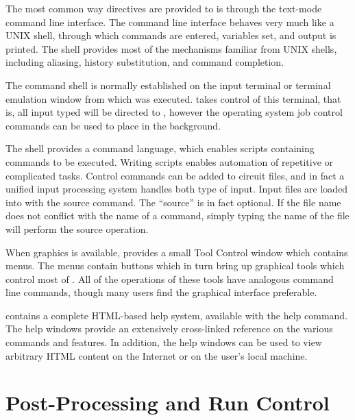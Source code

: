 The most common way directives are provided to {\WRspice} is through
the text-mode command line interface.  The command line interface
behaves very much like a UNIX shell, through which commands are
entered, variables set, and output is printed.  The shell provides
most of the mechanisms familiar from UNIX shells, including aliasing,
history substitution, and command completion.

The command shell is normally established on the input terminal or
terminal emulation window from which {\WRspice} was executed. 
{\WRspice} takes control of this terminal, that is, all input typed
will be directed to {\WRspice}, however the operating system job
control commands can be used to place {\WRspice} in the background.

The {\WRspice} shell provides a command language, which enables
scripts containing commands to be executed.  Writing scripts enables
automation of repetitive or complicated tasks.  Control commands can be
added to circuit files, and in fact a unified input processing system
handles both type of input.  Input files are loaded into {\WRspice} with
the {\cb source} command.  The ``{\vt source}'' is in fact optional.
If the file name does not conflict with the name of a {\WRspice} command,
simply typing the name of the file will perform the {\cb source}
operation.

When graphics is available, {\WRspice} provides a small {\cb Tool
Control} window which contains menus.  The menus contain buttons
which in turn bring up graphical tools which control most of
{\WRspice}.  All of the operations of these tools have analogous
command line commands, though many users find the graphical interface
preferable.

{\WRspice} contains a complete HTML-based help system, available with
the {\et help} command.  The help windows provide an extensively
cross-linked reference on the various commands and features.  In addition,
the help windows can be used to view arbitrary HTML content on the Internet
or on the user's local machine.


\section{Post-Processing and Run Control}


